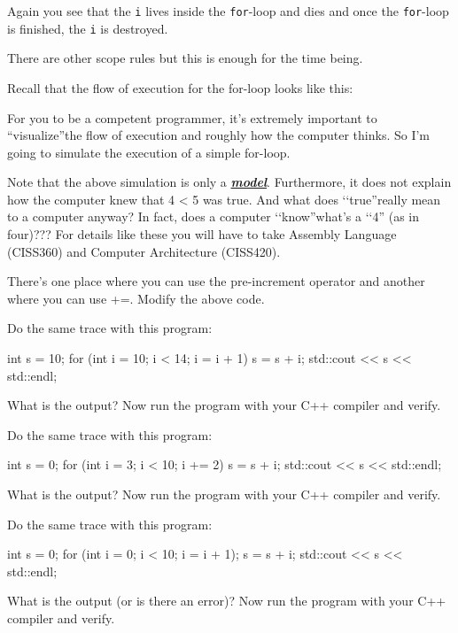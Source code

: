 Again you see that the \texttt{i} lives inside the \texttt{for}-loop and
dies and once the \texttt{for}-loop is finished, the \texttt{i} is
destroyed.

There are other scope rules but this is enough for the time being.

\newpage{}

Recall that the flow of execution for the for-loop looks like this:

For you to be a competent programmer, it's extremely
important to ``visualize''the flow of execution and roughly how the
computer thinks. So I'm going to simulate the execution
of a simple for-loop.


Note that the above simulation is only a \emph{\textbf{\underline{model}}}.
Furthermore, it does not explain how the computer knew that 4
< 5 was true. And what does \lq\lq true''really mean to a computer
anyway? In fact, does a computer \lq\lq know''what's a \lq\lq 4''
(as in four)??? For details like these you will have to take Assembly
Language (CISS360) and Computer Architecture (CISS420).


\begin{ex}
There's one place where you can use
the pre-increment operator and another where you can use +=. Modify the
above code.
\end{ex}

\begin{ex}
Do the same trace with this program:
\begin{console}
int s = 10;
for (int i = 10; i < 14; i = i + 1)
{   
    s = s + i;
}
std::cout << s << std::endl;
\end{console}
\end{ex}
What is the output? Now run the program with your C++ compiler and
verify.

\begin{ex}
Do the same trace with this program:
\begin{console}
int s = 0;
for (int i = 3; i < 10; i += 2)
{   
    s = s + i;
}
std::cout << s << std::endl;
\end{console}
\end{ex}

What is the output? Now run the program with your C++ compiler and
verify.

\begin{ex}
Do the same trace with this program:
\begin{console}
int s = 0;
for (int i = 0; i < 10; i = i + 1);
    s = s + i;
std::cout << s << std::endl;
\end{console}
\end{ex}
What is the output (or is there an error)? Now run the program with your
C++ compiler and verify.

